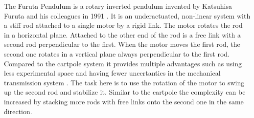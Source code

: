 The Furuta Pendulum is a rotary inverted pendulum invented by Katsuhisa Furuta and his colleagues in 1991 \cite{Furuta1991}. It is an underactuated, non-linear system with a stiff rod attached to a single motor by a rigid link. The motor rotates the rod in a horizontal plane. Attached to the other end of the rod is a free link with a second rod perpendicular to the first. When the motor moves the first rod, the second one rotates in a vertical plane always perpendicular to the first rod. Compared to the cartpole system it provides multiple advantages such as using less experimental space and having fewer uncertanties in the mechanical transmission system \cite{Furuta1991}. The task here is to use the rotation of the motor to swing up the second rod and stabilize it. Similar to the cartpole the complexity can be increased by stacking more rods with free links onto the second one in the same direction.
